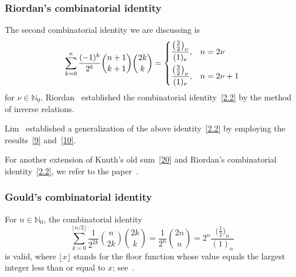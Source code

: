 \documentclass[reqno]{amsart}
\numberwithin{equation}{section}
\theoremstyle{plain}
\theoremstyle{remark}
\begin{document}
\subsubsection{Riordan's combinatorial identity}
The second combinatorial identity we are discussing is
\begin{equation}\label{2.2}
\sum_{k=0}^{n}\frac{(-1)^k}{2^k}\binom{n+1}{k+1}\binom{2k}{k}
=\begin{dcases}
\frac{\bigl(\frac32\bigr)_\nu}{(1)_\nu}, &n=2\nu\\
\frac{\bigl(\frac32\bigr)_\nu}{(1)_\nu}, &n=2\nu+1
\end{dcases}
\end{equation}
for $\nu\in\mathbb{N}_0$. Riordan~\cite{28} established the combinatorial identity~\eqref{2.2} by the method of inverse relations.
\par
Lim~\cite{19} established a generalization of the above identity~\eqref{2.2} by employing the results~\eqref{9} and~\eqref{10}. 
\par
For another extension of Knuth's old sum~\eqref{20} and Riordan's combinatorial identity~\eqref{2.2}, we refer to the paper~\cite{13}.

\subsubsection{Gould's combinatorial identity}
For $n\in\mathbb{N}_0$, the combinatorial identity
\begin{equation}\label{22}
\sum_{k=0}^{\lfloor n/2\rfloor}\frac{1}{2^{2k}}\binom{n}{2k}\binom{2k}{k} =\frac{1}{2^n}\binom{2n}{n}=2^{n}\frac{\bigl(\frac{1}{2}\bigr)_n}{(1)_n}
\end{equation}
is valid, where $\lfloor x\rfloor$ stands for the floor function whose value equals the largest integer less than or equal to $x$; see~\cite[p.~34, Eq.~(3.99)]{8}.
\end{document}
